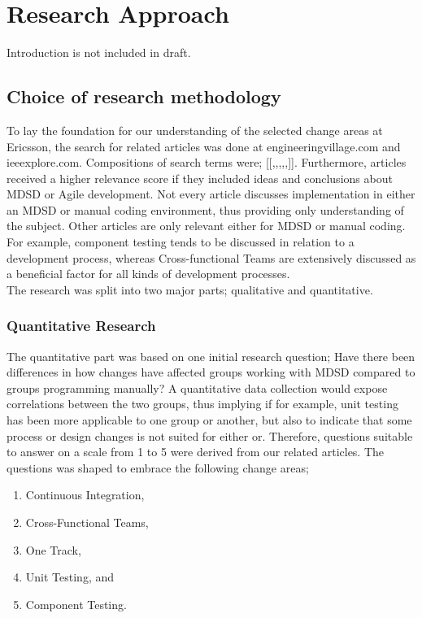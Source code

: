 \documentclass[final_report_innit.tex]{subfiles}
\begin{document}
\section{Research Approach}
Introduction is not included in draft.

\subsection{Choice of research methodology}
To lay the foundation for our understanding of the selected change areas at Ericsson, the search for related articles was done at engineeringvillage.com and ieeexplore.com. Compositions of search terms were; [[{},{},{},{},{},{}]]. Furthermore, articles received a higher relevance score if they included ideas and conclusions about MDSD or Agile development. Not every article discusses implementation in either an MDSD or manual coding environment, thus providing only understanding of the subject. Other articles are only relevant either for MDSD or manual coding. For example, component testing tends to be discussed in relation to a development process, whereas Cross-functional Teams are extensively discussed as a beneficial factor for all kinds of development processes.
\\

The research was split into two major parts; qualitative and quantitative.
\\
\subsubsection{Quantitative Research}
The quantitative part was based on one initial research question; Have there been differences in how changes have affected groups working with MDSD compared to groups programming manually? A quantitative data collection would expose correlations between the two groups, thus implying if for example, unit testing has been more applicable to one group or another, but also to indicate that some process or design changes is not suited for either or. Therefore, questions suitable to answer on a scale from 1 to 5 were derived from our related articles. The questions was shaped to embrace the following change areas;
\\
\begin{enumerate}
	\item Continuous Integration,
	\item Cross-Functional Teams,
	\item One Track,
	\item Unit Testing, and
	\item Component Testing. \\ %
\end{enumerate}
\end{document}
